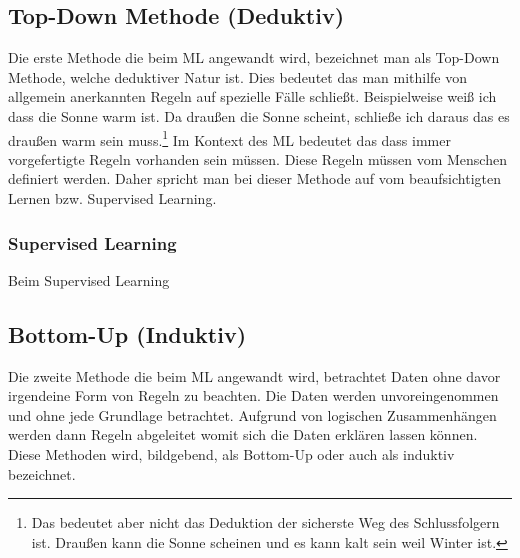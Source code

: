 \documentclass[12pt,german,ngerman]{report}
\begin{document}
    \subsection{Top-Down Methode (Deduktiv)}
        Die erste Methode die beim ML angewandt wird, bezeichnet man als Top-Down Methode,
        welche deduktiver Natur ist. Dies bedeutet das man mithilfe von allgemein anerkannten Regeln
        auf spezielle Fälle schließt.\cite{dundi2021unileipzig} 
        Beispielweise weiß ich dass die Sonne warm ist. Da draußen die Sonne scheint, schließe ich daraus
        das es draußen warm sein muss.\footnote{Das bedeutet aber nicht das Deduktion der sicherste Weg des 
        Schlussfolgern ist. Draußen kann die Sonne scheinen und es kann kalt sein weil Winter ist.}
        Im Kontext des ML bedeutet das dass immer vorgefertigte Regeln vorhanden sein müssen.
        Diese Regeln müssen vom Menschen definiert werden. Daher spricht man bei dieser Methode
        auf vom beaufsichtigten Lernen bzw. Supervised Learning.
        \subsubsection{Supervised Learning}
            Beim Supervised Learning 
           
        
    \subsection{Bottom-Up (Induktiv)}
        Die zweite Methode die beim ML angewandt wird, betrachtet Daten ohne davor irgendeine Form von Regeln zu beachten.  
        Die Daten werden unvoreingenommen und ohne jede Grundlage betrachtet.
        Aufgrund von logischen Zusammenhängen werden dann Regeln abgeleitet womit sich die Daten erklären lassen können.
        Diese Methoden wird, bildgebend, als Bottom-Up oder auch als induktiv\cite{dundi2021unileipzig} bezeichnet.
\end{document}

